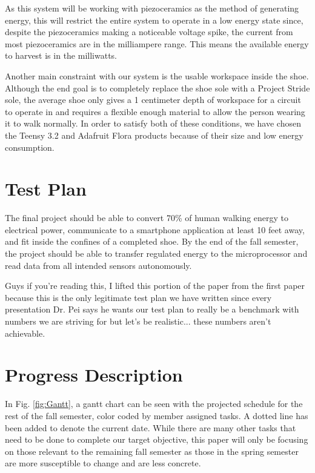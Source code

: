\documentclass[letterpaper, 12 pt, onecolumn, hidelinks]{ieeetran}
\begin{document}
As this system will be working with piezoceramics as the method of generating energy, this will restrict the entire system to operate in a low energy state since, despite the piezoceramics making a noticeable voltage spike, the current from most piezoceramics are in the milliampere range. This means the available energy to harvest is in the milliwatts.

Another main constraint with our system is the usable workspace inside the shoe. Although the end goal is to completely replace the shoe sole with a Project Stride sole, the average shoe only gives a 1 centimeter depth of workspace for a circuit to operate in and requires a flexible enough material to allow the person wearing it to walk normally. In order to satisfy both of these conditions, we have chosen the Teensy 3.2 and Adafruit Flora products because of their size and low energy consumption. 

\section{Test Plan}\label{sec:Plan}
The final project should be able to convert 70\% of human walking energy to electrical power, communicate to a smartphone application at least 10 feet away, and fit inside the confines of a completed shoe. By the end of the fall semester, the project should be able to transfer regulated energy to the microprocessor and read data from all intended sensors autonomously.

Guys if you're reading this, I lifted this portion of the paper from the first paper because this is the only legitimate test plan we have written since every presentation Dr. Pei says he wants our test plan to really be a benchmark with numbers we are striving for but let's be realistic... these numbers aren't achievable.

\section{Progress Description}\label{sec:Progress}
In Fig. \ref{fig:Gantt}, a gantt chart can be seen with the projected schedule for the rest of the fall semester, color coded by member assigned tasks. A dotted line has been added to denote the current date. While there are many other tasks that need to be done to complete our target objective, this paper will only be focusing on those relevant to the remaining fall semester as those in the spring semester are more susceptible to change and are less concrete.
\end{document}
